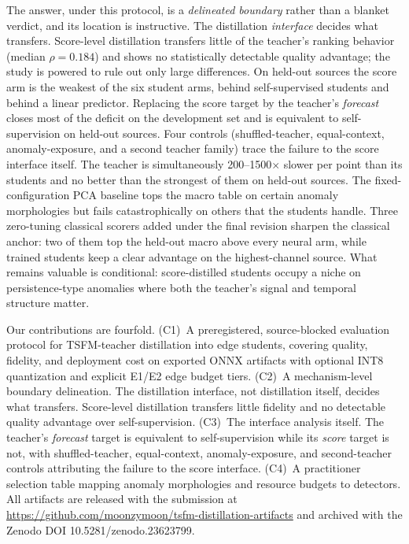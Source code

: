\documentclass[pdflatex,sn-basic,Numbered]{sn-jnl}
\begin{document}
The answer, under this protocol, is a
\emph{delineated boundary} rather than a blanket verdict, and its
location is instructive.
The distillation \emph{interface} decides what transfers.
Score-level distillation transfers little
of the teacher's ranking behavior (median $\rho = 0.184$) and shows no
statistically detectable quality advantage; the study is powered to
rule out only large differences. On held-out sources the score arm is
the weakest of the six student arms, behind self-supervised students
and behind a linear predictor. Replacing the
score target by the teacher's \emph{forecast} closes most of the
deficit on the development set and is equivalent to
self-supervision on held-out sources. Four controls (shuffled-teacher,
equal-context, anomaly-exposure, and a second teacher family) trace
the failure to the score interface itself. The teacher is simultaneously
200--1500$\times$ slower per
point than its students and no better than the strongest of them on
held-out sources. The fixed-configuration PCA baseline tops the macro
table on certain anomaly morphologies but fails catastrophically on
others that the students handle.
Three zero-tuning classical scorers added under the final revision
 sharpen the classical anchor: two of them top the held-out macro
above every neural arm, while trained students keep a clear advantage
on the highest-channel source. What remains valuable is conditional:
score-distilled students occupy a niche on persistence-type anomalies
where both the teacher's signal and temporal structure matter.

Our contributions are fourfold. (C1)~A preregistered, source-blocked
evaluation protocol for TSFM-teacher distillation into edge students,
covering quality, fidelity, and deployment cost on exported ONNX
artifacts with optional INT8 quantization and explicit E1/E2 edge
budget tiers. (C2)~A mechanism-level boundary delineation. The
distillation interface, not distillation itself, decides what
transfers. Score-level distillation transfers little fidelity and no
detectable quality advantage over self-supervision. (C3)~The interface
analysis itself. The teacher's \emph{forecast} target is equivalent to
self-supervision while its \emph{score} target is not, with
shuffled-teacher, equal-context, anomaly-exposure, and second-teacher
controls attributing the failure to the score interface. (C4)~A
practitioner selection table mapping anomaly morphologies and resource
budgets to detectors. All artifacts are released with the
submission at \url{https://github.com/moonzymoon/tsfm-distillation-artifacts}
and archived with the Zenodo DOI 10.5281/zenodo.23623799.
\end{document}
